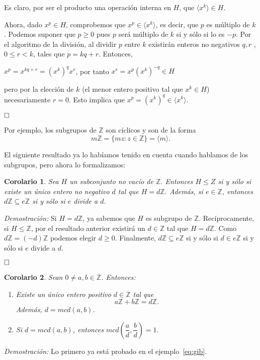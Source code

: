 \documentclass[12pt]{article}
\newtheorem{corolario}{Corolario}[theorem]
\begin{document}
Es claro, por ser el producto una operación interna en $H$, que $\langle x^{k} \rangle \in H$.

Ahora, dado $x ^{p} \in H$, comprobemos que $x^{p} \in \langle x^{k} \rangle$, es decir, que $p$ es múltiplo de $k$. Podemos suponer que $p \geq 0$ pues $p$ será múltiplo de $k$ si y sólo si lo es $-p$. Por el algoritmo de la división, al dividir $p$ entre $k$ existirán enteros no negativos $q,r$ , $0 \leq r < k$, tales que $p = kq + r$. Entonces, 
\begin{center}
$x^{p} = x^{kq+r} = (x^{k})^{q}x^{r}$, por tanto $x^{r} = x^{p}(x^{k})^{-q} \in H$
\end{center}
pero por la elección de $k$ (el menor entero positivo tal que $x^{k} \in H$) necesariamente $r = 0$. Esto implica que $x^{p} = (x^{k})^{q} \in \langle x^{k} \rangle$.

$\hfill \square$

Por ejemplo, los subgrupos de $\mathbb{Z}$ son cíclicos y son de la forma $$m\mathbb{Z} = \lbrace mz : z \in \mathbb{Z} \rbrace = \langle m \rangle.$$

El siguiente resultado ya lo habíamos tenido en cuenta cuando hablamos de los subgrupos, pero ahora lo formalizamos:

\begin{corolario}Sea $H$ un subconjunto no vacío de $\mathbb{Z}$. Entonces $H \leq Z$ si y sólo si existe un único entero no negativo $d$ tal que $H = d\mathbb{Z}$. Además, si $e \in \mathbb{Z}$, entonces $d\mathbb{Z} \subseteq e\mathbb{Z}$ si y sólo si $e$ divide a $d$.
\end{corolario}
\emph{Demostración: }Si $H = d\mathbb{Z}$, ya sabemos que $H$ es subgrupo de $\mathbb{Z}$. Recíprocamente, si $H \leq \mathbb{Z}$, por el resultado anterior existirá un $d \in \mathbb{Z}$ tal que $H = d\mathbb{Z}$. Como $d\mathbb{Z} = (-d)\mathbb{Z}$ podemos elegir $d \geq 0$. Finalmente, $d\mathbb{Z} \subseteq e\mathbb{Z}$ si y sólo si $d \in e\mathbb{Z}$ si y sólo si $e$ divide a $d$.

$\hfill \square$

\begin{corolario}Sean $0\neq a,b \in \mathbb{Z}$. Entonces:
\begin{enumerate}
\item Existe un único entero positivo $d \in \mathbb{Z}$ tal que $$a\mathbb{Z}+b\mathbb{Z} = d\mathbb{Z}.$$ Además, $d = mcd(a,b)$.
\item Si $d = mcd(a,b)$, entonces $mcd \left(\dfrac{a}{d}, \dfrac{b}{d} \right) = 1.$
\end{enumerate}
\end{corolario}
\emph{Demostración: }Lo primero ya está probado en el ejemplo~\ref{eq:gib}.
\end{document}
